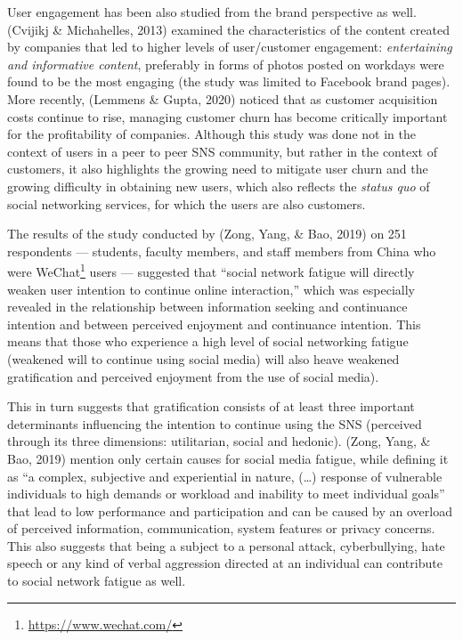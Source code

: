 \documentclass[
  10pt,
  dvipsnames]{scrartcl}
\begin{document}
User engagement has been also studied from the brand perspective as
well. (Cvijikj \& Michahelles, 2013) examined the characteristics of the
content created by companies that led to higher levels of user/customer
engagement: \textit{entertaining and informative content}, preferably in
forms of photos posted on workdays were found to be the most engaging
(the study was limited to Facebook brand pages). More recently, (Lemmens
\& Gupta, 2020) noticed that as customer acquisition costs continue to
rise, managing customer churn has become critically important for the
profitability of companies. Although this study was done not in the
context of users in a peer to peer SNS community, but rather in the
context of customers, it also highlights the growing need to mitigate
user churn and the growing difficulty in obtaining new users, which also
reflects the \textit{status quo} of social networking services, for
which the users are also customers.

The results of the study conducted by (Zong, Yang, \& Bao, 2019) on 251
respondents --- students, faculty members, and staff members from China
who were WeChat\footnote{\url{https://www.wechat.com/}} users ---
suggested that ``social network fatigue will directly weaken user
intention to continue online interaction,'' which was especially
revealed in the relationship between information seeking and continuance
intention and between perceived enjoyment and continuance intention.
This means that those who experience a high level of social networking
fatigue (weakened will to continue using social media) will also heave
weakened gratification and perceived enjoyment from the use of social
media).

This in turn suggests that gratification consists of at least three
important determinants influencing the intention to continue using the
SNS (perceived through its three dimensions: utilitarian, social and
hedonic). (Zong, Yang, \& Bao, 2019) mention only certain causes for
social media fatigue, while defining it as ``a complex, subjective and
experiential in nature, (\dots) response of vulnerable individuals to
high demands or workload and inability to meet individual goals'' that
lead to low performance and participation and can be caused by an
overload of perceived information, communication, system features or
privacy concerns. This also suggests that being a subject to a personal
attack, cyberbullying, hate speech or any kind of verbal aggression
directed at an individual can contribute to social network fatigue as
well.
\end{document}
